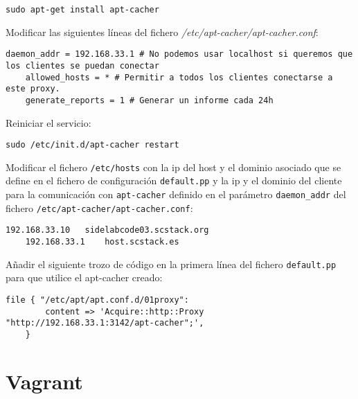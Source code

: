 \lstset{style=rubybasico}
\begin{lstlisting}[frame=trbl]
    sudo apt-get install apt-cacher
\end{lstlisting}

\par Modificar las siguientes líneas del fichero \emph{/etc/apt-cacher/apt-cacher.conf}:

\lstset{style=rubybasico}
\begin{lstlisting}[frame=trbl]
    daemon_addr = 192.168.33.1 # No podemos usar localhost si queremos que los clientes se puedan conectar
    allowed_hosts = * # Permitir a todos los clientes conectarse a este proxy.
    generate_reports = 1 # Generar un informe cada 24h
\end{lstlisting}

\par Reiniciar el servicio:

\lstset{style=rubybasico}
\begin{lstlisting}[frame=trbl]
    sudo /etc/init.d/apt-cacher restart
\end{lstlisting}

\par Modificar el fichero \texttt{/etc/hosts} con la ip del host y el dominio asociado que se define en el fichero de configuración \texttt{default.pp} y la ip y el dominio del cliente para la comunicación con \texttt{apt-cacher} definido en el parámetro \texttt{daemon\_addr} del fichero \texttt{/etc/apt-cacher/apt-cacher.conf}:

\lstset{style=rubybasico}
\begin{lstlisting}[frame=trbl]
    192.168.33.10   sidelabcode03.scstack.org
    192.168.33.1    host.scstack.es
\end{lstlisting}

\par Añadir el siguiente trozo de código en la primera línea del fichero \texttt{default.pp} para que utilice el apt-cacher creado:

\lstset{style=rubybasico}
\begin{lstlisting}[frame=trbl]
    file { "/etc/apt/apt.conf.d/01proxy":
        content => 'Acquire::http::Proxy "http://192.168.33.1:3142/apt-cacher";',
    }
\end{lstlisting}

\section{Vagrant}
\label{sec:vagrant}

